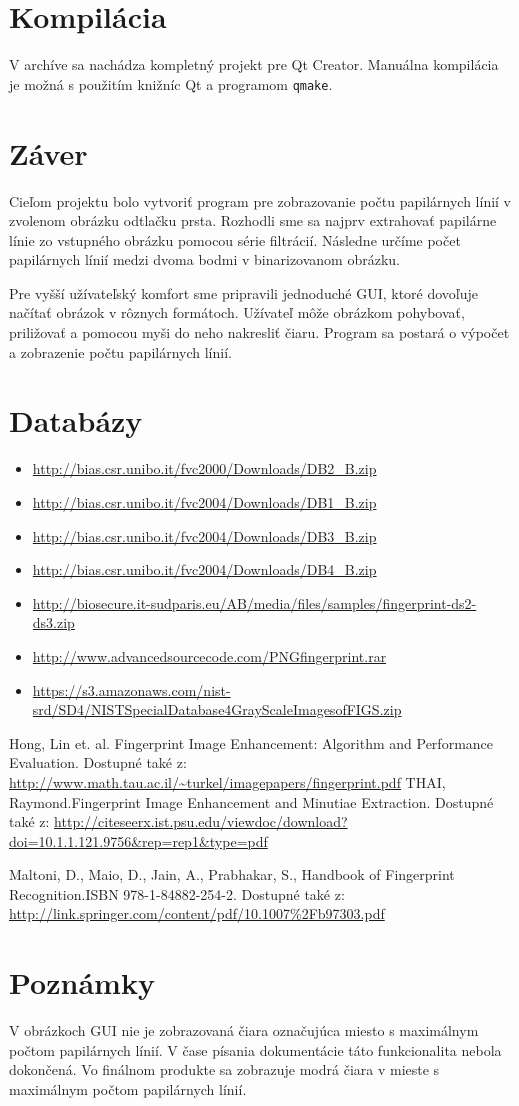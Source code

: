 \documentclass[11pt,a4paper]{article}
\begin{document}
\section*{Kompilácia}
V archíve sa nachádza kompletný projekt pre Qt Creator. Manuálna kompilácia je možná s použitím knižníc Qt a programom \texttt{qmake}.

\pagebreak

\section*{Záver}
Cieľom projektu bolo vytvoriť program pre zobrazovanie počtu papilárnych línií v zvolenom obrázku odtlačku prsta. Rozhodli sme sa najprv extrahovať papilárne línie zo vstupného obrázku pomocou série filtrácií. Následne určíme počet papilárnych línií medzi dvoma bodmi v binarizovanom obrázku. 

Pre vyšší užívateľský komfort sme pripravili jednoduché GUI, ktoré dovoľuje načítať obrázok v rôznych formátoch. Užívateľ môže obrázkom pohybovať, priližovať a pomocou myši do neho nakresliť čiaru. Program sa postará o výpočet a zobrazenie počtu papilárnych línií.

\pagebreak
\section*{Databázy}
\begin{itemize}
	\item \url{http://bias.csr.unibo.it/fvc2000/Downloads/DB2_B.zip}
	\item \url{http://bias.csr.unibo.it/fvc2004/Downloads/DB1_B.zip}
	\item \url{http://bias.csr.unibo.it/fvc2004/Downloads/DB3_B.zip}
	\item \url{http://bias.csr.unibo.it/fvc2004/Downloads/DB4_B.zip}
	\item \url{http://biosecure.it-sudparis.eu/AB/media/files/samples/fingerprint-ds2-ds3.zip}
	\item \url{http://www.advancedsourcecode.com/PNGfingerprint.rar}
	\item \url{https://s3.amazonaws.com/nist-srd/SD4/NISTSpecialDatabase4GrayScaleImagesofFIGS.zip}
\end{itemize}

\begin{thebibliography}{9}
	Hong, Lin et. al. Fingerprint Image Enhancement: Algorithm and Performance Evaluation. Dostupné také z: \url{http://www.math.tau.ac.il/~turkel/imagepapers/fingerprint.pdf}
	THAI, Raymond.Fingerprint Image Enhancement and	Minutiae Extraction. Dostupné také z: \url{http://citeseerx.ist.psu.edu/viewdoc/download?doi=10.1.1.121.9756&rep=rep1&type=pdf}
	
	Maltoni, D., Maio, D., Jain, A., Prabhakar, S., Handbook of Fingerprint Recognition.ISBN 978-1-84882-254-2. Dostupné také z: \url{http://link.springer.com/content/pdf/10.1007%2Fb97303.pdf}
\end{thebibliography}


\section*{Poznámky}
V obrázkoch GUI nie je zobrazovaná čiara označujúca miesto s maximálnym počtom papilárnych línií. V čase písania dokumentácie táto funkcionalita nebola dokončená. Vo finálnom produkte sa zobrazuje modrá čiara v mieste s maximálnym počtom papilárnych línií.
\end{document}
